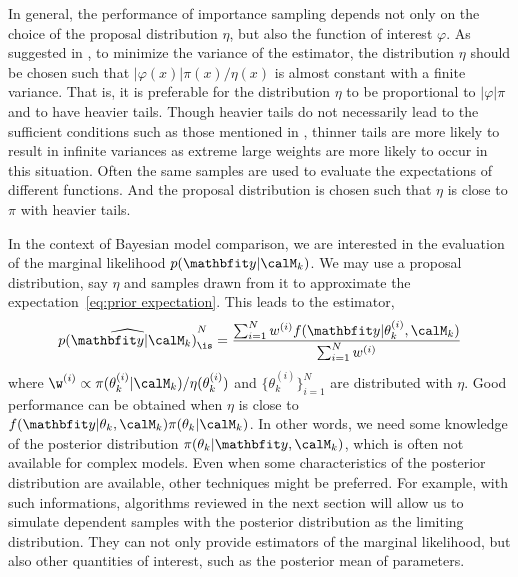 In general, the performance of importance sampling depends not only on the
choice of the proposal distribution $\eta$, but also the function of interest
$\varphi$. As suggested in \cite[][sec.~3.3.2]{Robert:2004tn}, to minimize the
variance of the estimator, the distribution $\eta$ should be chosen such that
$|\varphi(x)|\pi(x)/\eta(x)$ is almost constant with a finite variance. That
is, it is preferable for the distribution $\eta$ to be proportional to
$|\varphi|\pi$ and to have heavier tails. Though heavier tails do not
necessarily lead to the sufficient conditions such as those mentioned in
\cite{Geweke:1989tm}, thinner tails are more likely to result in infinite
variances as extreme large weights are more likely to occur in this situation.
Often the same samples are used to evaluate the expectations of different
functions. And the proposal distribution is chosen such that $\eta$ is close
to $\pi$ with heavier tails.


In the context of Bayesian model comparison, we are interested in the
evaluation of the marginal likelihood $p(\data|\calM_k)$. We may use a
proposal distribution, say $\eta$ and samples drawn from it to approximate the
expectation~\eqref{eq:prior expectation}. This leads to the estimator,
\begin{equation}
  \widehat{p(\data|\calM_k)}_{\is}^N =
  \frac{\sum_{i=1}^N w^{(i)} f(\data|\theta_k^{(i)},\calM_k)}
  {\sum_{i=1}^N w^{(i)}}
\end{equation}
where $\w^{(i)}\propto\pi(\theta_k^{(i)}|\calM_k)/\eta(\theta_k^{(i)})$ and
$\{\theta_k^{(i)}\}_{i=1}^N$ are distributed with $\eta$. Good performance can
be obtained when $\eta$ is close to
$f(\data|\theta_k,\calM_k)\pi(\theta_k|\calM_k)$. In other words, we need some
knowledge of the posterior distribution $\pi(\theta_k|\data,\calM_k)$, which
is often not available for complex models. Even when some characteristics of
the posterior distribution are available, other techniques might be preferred.
For example, with such informations, algorithms reviewed in the next section
will allow us to simulate dependent samples with the posterior distribution as
the limiting distribution. They can not only provide estimators of the
marginal likelihood, but also other quantities of interest, such as the
posterior mean of parameters.

